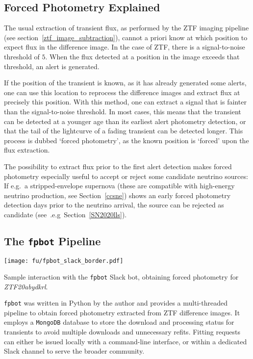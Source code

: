 \subsection{Forced Photometry Explained}
The usual extraction of transient flux, as performed by the ZTF imaging pipeline (see section~\ref{ztf_image_subtraction}), cannot a priori know at which position to expect flux in the difference image. In the case of ZTF, there is a signal-to-noise threshold of $5$. When the flux detected at a position in the image exceeds that threshold, an alert is generated.

If the position of the transient is known, as it has already generated some alerts, one can use this location to reprocess the difference images and extract flux at precisely this position. With this method, one can extract a signal that is fainter than the signal-to-noise threshold. In most cases, this means that the transient can be detected at a younger age than its earliest alert photometry detection, or that the tail of the lightcurve of a fading transient can be detected longer. This process is dubbed `forced photometry', as the known position is `forced' upon the flux extraction.

The possibility to extract flux prior to the first alert detection makes forced photometry especially useful to accept or reject some candidate neutrino sources: If e.g.\ a stripped-envelope supernova (these are compatible with high-energy neutrino production, see Section~\ref{ccsne}) shows an early forced photometry detection days prior to the neutrino arrival, the source can be rejected as candidate (see~.e.g\ Section~\ref{SN2020lls}).

\subsection{The \texttt{fpbot} Pipeline}
\begin{marginfigure}
    \texttt{[image: fu/fpbot\_slack\_border.pdf]}
    \caption[\texttt{fpbot} Slack bot interaction]{Sample interaction with the \texttt{fpbot} Slack bot, obtaining forced photometry for \textit{ZTF20abydkrl}.}
\end{marginfigure}

\texttt{fpbot} was written in Python by the author and provides a multi-threaded pipeline to obtain forced photometry extracted from ZTF difference images. It employs a \texttt{MongoDB} database to store the download and processing status for transients to avoid multiple downloads and unnecessary refits. Fitting requests can either be issued locally with a command-line interface, or within a dedicated Slack channel to serve the broader community.

